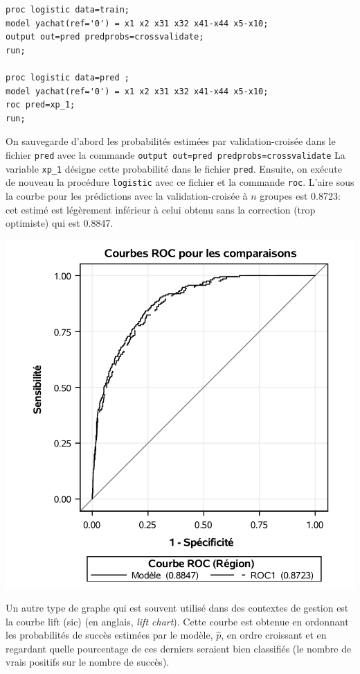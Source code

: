 \documentclass[
  11pt,
  letterpaper,
]{book}
\theoremstyle{definition}
\theoremstyle{definition}
\theoremstyle{definition}
\theoremstyle{remark}
\begin{document}
\begin{verbatim}
proc logistic data=train;
model yachat(ref='0') = x1 x2 x31 x32 x41-x44 x5-x10;
output out=pred predprobs=crossvalidate;
run;

proc logistic data=pred ;
model yachat(ref='0') = x1 x2 x31 x32 x41-x44 x5-x10;
roc pred=xp_1;
run;
\end{verbatim}

On sauvegarde d'abord les probabilités estimées par validation-croisée dans le
fichier \texttt{pred} avec la commande \texttt{output\ out=pred\ predprobs=crossvalidate}
La variable \texttt{xp\_1} désigne cette probabilité dans le fichier \texttt{pred}. Ensuite, on
exécute de nouveau la procédure \texttt{logistic} avec ce fichier et la commande \texttt{roc}.
L'aire sous la courbe pour les prédictions avec la validation-croisée à \(n\) groupes est 0.8723: cet estimé est légèrement inférieur à celui obtenu sans
la correction (trop optimiste) qui est 0.8847.

\begin{center}\includegraphics[width=0.8\linewidth]{figures/03-logistic-e15} \end{center}

Un autre type de graphe qui est souvent utilisé dans des contextes de gestion
est la courbe lift (sic) (en anglais, \emph{lift chart}). Cette courbe est obtenue en ordonnant les probabilités de succès estimées par le modèle, \(\widehat{p}\), en ordre croissant et en regardant quelle pourcentage de ces derniers seraient bien classifiés (le nombre de vrais positifs sur le nombre de succès).
\end{document}
